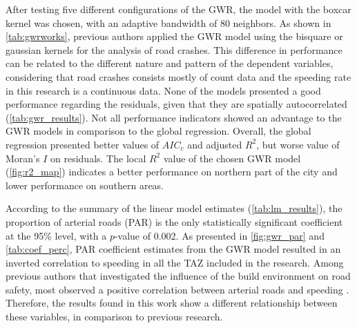 After testing five different configurations of the GWR, the model with the boxcar kernel was chosen, with an adaptive bandwidth of 80 neighbors. As shown in \autoref{tab:gwrworks}, previous authors applied the GWR model using the bisquare or gaussian kernels for the analysis of road crashes. This difference in performance can be related to the different nature and pattern of the dependent variables, considering that road crashes consists mostly of count data and the speeding rate in this research is a continuous data. None of the models presented a good performance regarding the residuals, given that they are spatially autocorrelated (\autoref{tab:gwr_results}). Not all performance indicators showed an advantage to the GWR models in comparison to the global regression. Overall, the global regression presented better values of $AIC_c$ and adjusted $R^2$, but worse value of Moran's $I$ on residuals. The local $R^2$ value of the chosen GWR model (\autoref{fig:r2_map}) indicates a better performance on northern part of the city and lower performance on southern areas.




According to the summary of the linear model estimates (\autoref{tab:lm_results}), the proportion of arterial roads (PAR) is the only statistically significant coefficient at the 95\% level, with a $p$-value of 0.002. As presented in \autoref{fig:gwr_par} and \autoref{tab:coef_perc}, PAR coefficient estimates from the GWR model resulted in an inverted correlation to speeding in all the TAZ included in the research. Among previous authors that investigated the influence of the build environment on road safety, most observed a positive correlation between arterial roads and speeding \cite{Dumbaugh2011,Ewing2009, Huang2018,Obelheiro2020}. Therefore, the results found in this work show a different relationship between these variables, in comparison to previous research. 

